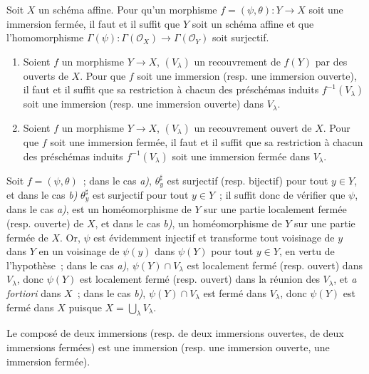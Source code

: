\begin{corollary}[4.2.3]
\label{I.4.2.3-fr}
Soit $X$ un schéma affine. Pour qu'un morphisme
$f=(\psi,\theta):Y\to X$ soit une immersion fermée, il faut et il suffit que
$Y$ soit un schéma affine et que l'homomorphisme
$\Gamma(\psi):\Gamma(\mathscr{O}_X)\to\Gamma(\mathscr{O}_Y)$ soit surjectif.
\end{corollary}

\begin{corollary}[4.2.4]
\label{I.4.2.4-fr}
\begin{enumerate}
  \item[\textup{a)}] Soient $f$ un morphisme $Y\to X$, $(V_\lambda)$ un recouvrement
  de $f(Y)$ par des ouverts de $X$. Pour que $f$ soit une immersion (\textup{resp.} une
  immersion ouverte), il faut et il suffit
  que sa restriction à chacun des préschémas induits $f^{-1}(V_\lambda)$ soit
  une immersion (\textup{resp.} une immersion ouverte) dans $V_\lambda$.
  \item[\textup{b)}] Soient $f$ un morphisme $Y\to X$, $(V_\lambda)$ un recouvrement
  ouvert de $X$. Pour que $f$ soit une immersion fermée, il faut et il suffit
  que sa restriction à chacun des préschémas induits $f^{-1}(V_\lambda)$ soit
  une immersion fermée dans $V_\lambda$.
\end{enumerate}
\end{corollary}

Soit $f=(\psi,\theta)$~; dans le cas \emph{a)}, $\theta_y^\sharp$ est surjectif
(resp. bijectif) pour tout $y\in Y$, et dans le cas \emph{b)} $\theta_y^\sharp$ est
surjectif pour tout $y\in Y$~; il suffit donc de vérifier que $\psi$, dans le
cas \emph{a)}, est un homéomorphisme de $Y$ sur une partie localement fermée (resp.
ouverte) de $X$, et dans le cas \emph{b)}, un homéomorphisme de $Y$ sur une partie
fermée de $X$. Or, $\psi$ est évidemment injectif et transforme tout voisinage
de $y$ dans $Y$ en un voisinage de $\psi(y)$ dans $\psi(Y)$ pour tout $y\in Y$,
en vertu de l'hypothèse~; dans le cas \emph{a)}, $\psi(Y)\cap V_\lambda$ est localement
fermé (resp. ouvert) dans $V_\lambda$, donc $\psi(Y)$ est localement fermé
(resp. ouvert) dans la réunion des $V_\lambda$, et \emph{a fortiori} dans $X$~;
dans le cas \emph{b)}, $\psi(Y)\cap V_\lambda$ est fermé dans $V_\lambda$, donc
$\psi(Y)$ est fermé dans $X$ puisque $X=\bigcup_\lambda V_\lambda$.

\begin{proposition}[4.2.5]
\label{I.4.2.5-fr}
Le composé de deux immersions (\textup{resp.} de deux immersions ouvertes, de deux
immersions fermées) est une immersion (\textup{resp.} une immersion ouverte, une
immersion fermée).
\end{proposition}

